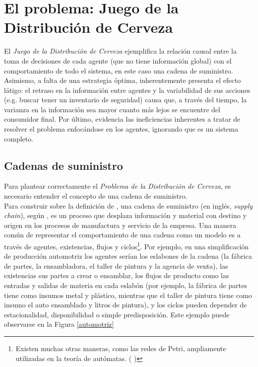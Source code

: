 \chapter{El problema: Juego de la Distribuci\'on de Cerveza}

El \textit{Juego de la Distribución de Cerveza} ejemplifica la relaci\'on causal entre la toma de decisiones de cada agente (que no tiene informaci\'on global) con el comportamiento de todo el sistema, en este caso una cadena de suministro. Asimismo, a falta de una estrategia \'optima, inherentemente presenta el efecto l\'atigo: el retraso en la informaci\'on entre agentes y la variabilidad de sus acciones (e.g. buscar tener un inventario de seguridad) causa que, a trav\'es del tiempo, la varianza en la informaci\'on sea mayor cuanto m\'as lejos se encuentre del consumidor final. Por \'ultimo, evidencia las ineficiencias inherentes a tratar de resolver el problema enfoc\'andose en los agentes, ignorando que es un sistema completo. 




\section{Cadenas de suministro}

Para plantear correctamente el \textit{Problema de la Distribuci\'on de Cerveza}, es necesario entender el concepto de una cadena de suministro. \\

Para construir sobre la definici\'on de \citet{Sterman}, una cadena de suministro (en ingl\'es, \textit{supply chain}), seg\'un \citet{Jacobs}, es un proceso que desplaza informaci\'on y material con destino y origen en los procesos de manufactura y servicio de la empresa. Una manera com\'un de representar el comportamiento de una cadena como un modelo es a trav\'es de agentes, existencias, flujos y ciclos\footnote{Existen muchas otras maneras, como las redes de Petri, ampliamente utilizadas en la teor\'ia de aut\'omatas. ( \citet{Shiflet})}. Por ejemplo, en una simplificaci\'on de producci\'on automotriz los agentes ser\'ian los eslabones de la cadena (la f\'abrica de partes, la ensambladora, el taller de pintura y la agencia de venta), las existencias sus partes a crear o ensamblar, los flujos de producto como las entradas y salidas de materia en cada eslab\'on (por ejemplo, la f\'abrica de partes tiene como insumos metal y pl\'astico, mientras que el taller de pintura tiene como insumo el auto ensamblado y litros de pintura), y los ciclos pueden depender de estacionalidad, disponibilidad o simple predisposici\'on. Este ejemplo puede observarse en la Figura \ref{automotriz}\\


